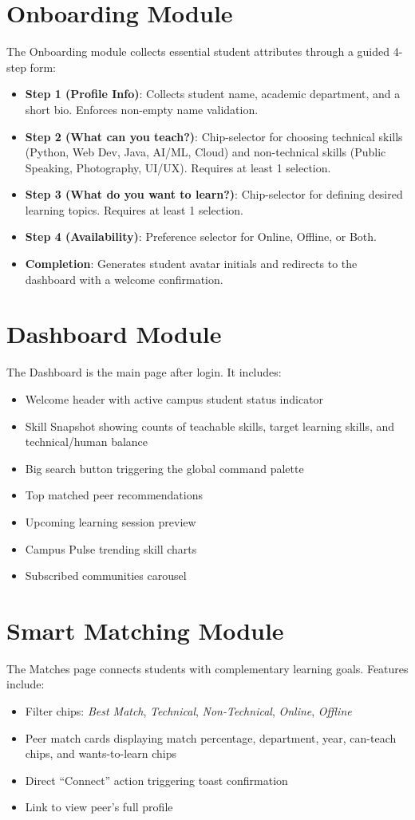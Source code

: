 \documentclass[12pt,a4paper]{report}
\begin{document}
\section{Onboarding Module}
The Onboarding module collects essential student attributes through a guided 4-step form:
\begin{itemize}
    \item \textbf{Step 1 (Profile Info)}: Collects student name, academic department, and a short bio. Enforces non-empty name validation.
    \item \textbf{Step 2 (What can you teach?)}: Chip-selector for choosing technical skills (Python, Web Dev, Java, AI/ML, Cloud) and non-technical skills (Public Speaking, Photography, UI/UX). Requires at least 1 selection.
    \item \textbf{Step 3 (What do you want to learn?)}: Chip-selector for defining desired learning topics. Requires at least 1 selection.
    \item \textbf{Step 4 (Availability)}: Preference selector for Online, Offline, or Both.
    \item \textbf{Completion}: Generates student avatar initials and redirects to the dashboard with a welcome confirmation.
\end{itemize}

\section{Dashboard Module}
The Dashboard is the main page after login.
It includes:
\begin{itemize}
    \item Welcome header with active campus student status indicator
    \item Skill Snapshot showing counts of teachable skills, target learning skills, and technical/human balance
    \item Big search button triggering the global command palette
    \item Top matched peer recommendations
    \item Upcoming learning session preview
    \item Campus Pulse trending skill charts
    \item Subscribed communities carousel
\end{itemize}

\section{Smart Matching Module}
The Matches page connects students with complementary learning goals.
Features include:
\begin{itemize}
    \item Filter chips: \textit{Best Match}, \textit{Technical}, \textit{Non-Technical}, \textit{Online}, \textit{Offline}
    \item Peer match cards displaying match percentage, department, year, can-teach chips, and wants-to-learn chips
    \item Direct ``Connect'' action triggering toast confirmation
    \item Link to view peer's full profile
\end{itemize}
\end{document}
